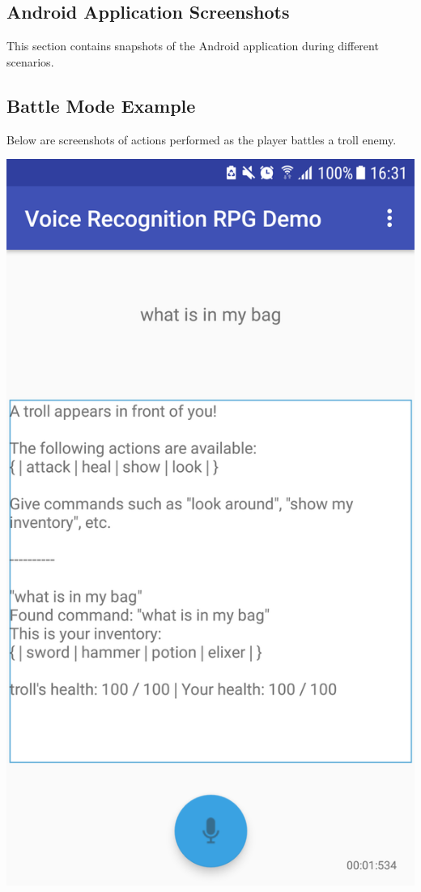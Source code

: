 \documentclass[11pt]{article}
\begin{document}
\newpage
\begin{appendices}
\section{Android Application Screenshots}
This section contains snapshots of the Android application during different scenarios.
\label{appendix:screenshots}
\subsection{Battle Mode Example}
\label{appendix:battle-mode-screenshots}
Below are screenshots of actions performed as the player battles a troll enemy.

\begin{center}
\includegraphics[scale=0.18]{battle-1.png}

\end{center}
\end{appendices}
\end{document}
